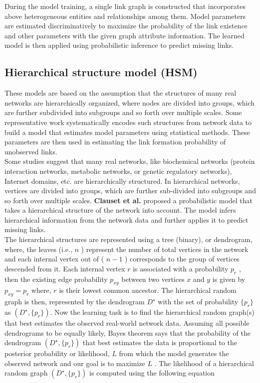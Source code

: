 During the model training, a single link graph is constructed that
incorporates above heterogeneous entities and relationships among them.
Model parameters are estimated discriminatively to maximize the
probability of the link existence and other parameters with the given
graph attribute information. The learned model is then applied using
probabilistic inference to predict missing links.\\

\subsection{Hierarchical structure model (HSM)}

These models are based on the assumption that the structures of many
real networks are hierarchically organized, where nodes are divided into
groups, which are further subdivided into subgroups and so forth over
multiple scales. Some representative work systematically encodes such
structures from network data to build a model that estimates model
parameters using statistical methods. These parameters are then used in
estimating the link formation probability of unobserved links.\\

Some studies suggest that many real networks, like biochemical networks
(protein interaction networks, metabolic networks, or genetic regulatory
networks), Internet domains, etc. are hierarchically structured. In
hierarchical networks, vertices are divided into groups, which are
further sub-divided into subgroups and so forth over multiple scales.
\textbf{Clauset et al.} proposed a probabilistic model that takes a
hierarchical structure of the network into account. The model infers
hierarchical information from the network data and further applies it to
predict missing links.\\

The hierarchical structures are represented using a tree (binary), or
dendrogram, where, the leaves (i.e., \(n\) ) represent the number of
total vertices in the network and each internal vertex out of (
\(n - 1\) ) corresponds to the group of vertices descended from it. Each
internal vertex \(r\) is associated with a probability \(p_r\) , then
the existing edge probability \(p_{xy}\) between two vertices \(x\) and
\(y\) is given by \(p_{xy} = p_r\) where, \(r\) is their lowest common
ancestor. The hierarchical random graph is then, represented by the
dendrogram \(D^{\star}\) with the set of probability \(\{ p_r \}\) as
\(\left( D^{\star},\{p_r\} \right)\). Now the learning task is to find
the hierarchical random graph(s) that best estimates the observed
real-world network data. Assuming all possible dendrograms to be equally
likely, Bayes theorem says that the probability of the dendrogram
\(\left(D^{\star}, \{p_r\} \right)\) that best estimates the data is
proportional to the posterior probability or likelihood, \(L\) from
which the model generates the observed network and our goal is to
maximize \(L\) . The likelihood of a hierarchical random graph
\(\left(D^{\star},\{p_r\} \right)\) is computed using the following
equation

